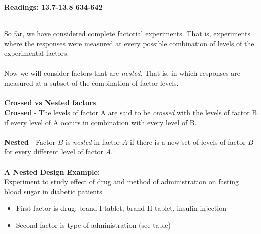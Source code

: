 \begin{center}\large\textbf{Readings: 13.7-13.8 634-642}\\
\normalsize \end{center}
\large \hlinewd{2pt}
~\\
So far, we have considered complete factorial experiments.  That is, experiments where the responses were measured at every possible combination of levels of the experimental factors.  \\~\\
Now we will consider factors that are \textit{nested}.  That is, in which responses are measured at a subset of the combination of factor levels.  \\~\\
\textbf{Crossed vs Nested factors}\\
\textbf{Crossed} - The levels of factor A are said to be \textit{crossed} with the levels of factor B if every level of A occurs in combination with every level of B.\\~\\
\textbf{Nested} - Factor $B$ is \textit{nested} in factor $A$ if there is a new set of levels of factor $B$ for every different level of factor $A$.\\~\\

\textbf{A Nested Design Example:}\\
Experiment to study effect of drug and method of administration on fasting blood sugar in diabetic patients
\begin{itemize}
\item First factor is drug: brand I tablet, brand II tablet, insulin injection 
\item Second factor is type of administration (see table)
\end{itemize}

